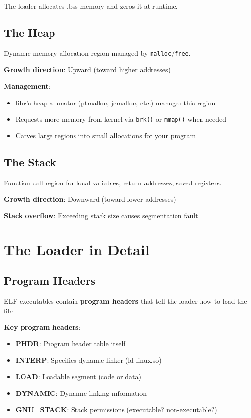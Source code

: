 The loader allocates .bss memory and zeros it at runtime.

\subsection{The Heap}

Dynamic memory allocation region managed by \texttt{malloc}/\texttt{free}.

\textbf{Growth direction}: Upward (toward higher addresses)

\textbf{Management}:
\begin{itemize}
    \item libc's heap allocator (ptmalloc, jemalloc, etc.) manages this region
    \item Requests more memory from kernel via \texttt{brk()} or \texttt{mmap()} when needed
    \item Carves large regions into small allocations for your program
\end{itemize}

\subsection{The Stack}

Function call region for local variables, return addresses, saved registers.

\textbf{Growth direction}: Downward (toward lower addresses)

\textbf{Stack overflow}: Exceeding stack size causes segmentation fault

\section{The Loader in Detail}

\subsection{Program Headers}

ELF executables contain \textbf{program headers} that tell the loader how to load the file.

\textbf{Key program headers}:
\begin{itemize}
    \item \textbf{PHDR}: Program header table itself
    \item \textbf{INTERP}: Specifies dynamic linker (ld-linux.so)
    \item \textbf{LOAD}: Loadable segment (code or data)
    \item \textbf{DYNAMIC}: Dynamic linking information
    \item \textbf{GNU\_STACK}: Stack permissions (executable? non-executable?)
\end{itemize}

